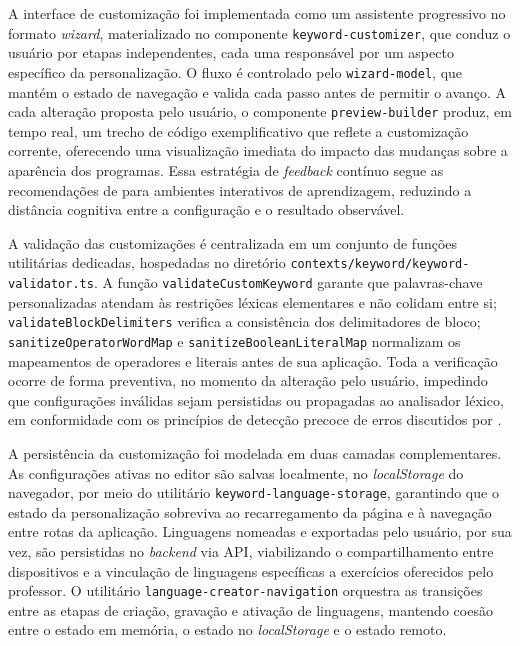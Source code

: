 A interface de customização foi implementada como um assistente progressivo no formato \textit{wizard}, materializado no componente \texttt{keyword-customizer}, que conduz o usuário por etapas independentes, cada uma responsável por um aspecto específico da personalização. O fluxo é controlado pelo \texttt{wizard-model}, que mantém o estado de navegação e valida cada passo antes de permitir o avanço. A cada alteração proposta pelo usuário, o componente \texttt{preview-builder} produz, em tempo real, um trecho de código exemplificativo que reflete a customização corrente, oferecendo uma visualização imediata do impacto das mudanças sobre a aparência dos programas. Essa estratégia de \textit{feedback} contínuo segue as recomendações de  para ambientes interativos de aprendizagem, reduzindo a distância cognitiva entre a configuração e o resultado observável.

A validação das customizações é centralizada em um conjunto de funções utilitárias dedicadas, hospedadas no diretório \texttt{contexts/keyword/keyword-validator.ts}. A função \texttt{validateCustomKeyword} garante que palavras-chave personalizadas atendam às restrições léxicas elementares e não colidam entre si; \texttt{validateBlockDelimiters} verifica a consistência dos delimitadores de bloco; \texttt{sanitizeOperatorWordMap} e \texttt{sanitizeBooleanLiteralMap} normalizam os mapeamentos de operadores e literais antes de sua aplicação. Toda a verificação ocorre de forma preventiva, no momento da alteração pelo usuário, impedindo que configurações inválidas sejam persistidas ou propagadas ao analisador léxico, em conformidade com os princípios de detecção precoce de erros discutidos por .

A persistência da customização foi modelada em duas camadas complementares. As configurações ativas no editor são salvas localmente, no \textit{localStorage} do navegador, por meio do utilitário \texttt{keyword-language-storage}, garantindo que o estado da personalização sobreviva ao recarregamento da página e à navegação entre rotas da aplicação. Linguagens nomeadas e exportadas pelo usuário, por sua vez, são persistidas no \textit{backend} via API, viabilizando o compartilhamento entre dispositivos e a vinculação de linguagens específicas a exercícios oferecidos pelo professor. O utilitário \texttt{language-creator-navigation} orquestra as transições entre as etapas de criação, gravação e ativação de linguagens, mantendo coesão entre o estado em memória, o estado no \textit{localStorage} e o estado remoto.

